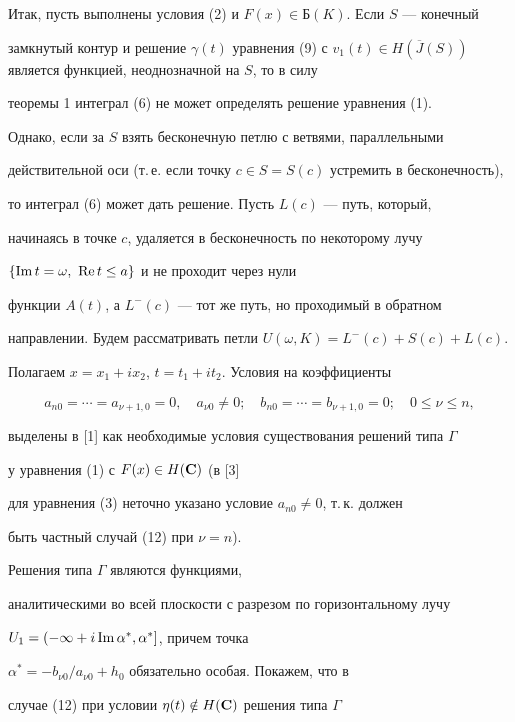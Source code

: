 Итак, пусть выполнены условия (2) и $F(x)\in Б(K)$. Если $S$ --- конечный


замкнутый контур и решение $\gamma(t)$ уравнения (9) с $v_1(t)\in


H(\overline J(S))$ является функцией, неоднозначной на $S$, то в силу


теоремы 1 интеграл (6) не может определять решение уравнения (1).


Однако, если за $S$ взять бесконечную петлю с ветвями, параллельными


действительной оси (т.\,е. если точку $c\in S=S(c)$ устремить в бесконечность),


то интеграл (6) может дать решение. Пусть $L(c)$ --- путь, который,


начинаясь в точке $c$, удаляется в бесконечность по некоторому лучу


$\{\operatorname{Im} t=\omega,\ \operatorname{Re} t\le a \}$ и не проходит через нули


функции $A(t)$, а $L^-(c)$ --- тот же путь, но проходимый в обратном


направлении. Будем рассматривать петли $U(\omega,K)=L^-(c)+S(c)+L(c)$.


Полагаем $x=x_1+ix_2$, $t=t_1+it_2$. Условия на коэффициенты


\begin{equation}


a_{n0}=\dotsb=a_{\nu+1,0}=0, \quad a_{\nu 0}\ne 0;\quad


b_{n0}=\dotsb=b_{\nu+1,0}=0; \quad 0\le\nu\le n,


\end{equation}


выделены в [1] как необходимые условия существования решений типа $\Gamma$


у уравнения (1) с $F(x)\in H(\bold C)$ (в [3]


для уравнения (3) неточно указано условие $a_{n0}\ne 0$, т.\,к. должен


быть частный случай (12) при $\nu =n$).


Решения типа $\Gamma$ являются функциями,


аналитическими во всей плоскости с разрезом по горизонтальному лучу


$U_1=(-\infty+i\operatorname{Im}\alpha^*,\alpha^*]$, причем точка


$\alpha^*=-b_{\nu 0}/a_{\nu 0}+h_0$ обязательно особая. Покажем, что в


случае (12) при условии $\eta(t)\notin H(\bold C)$ решения типа $\Gamma$


